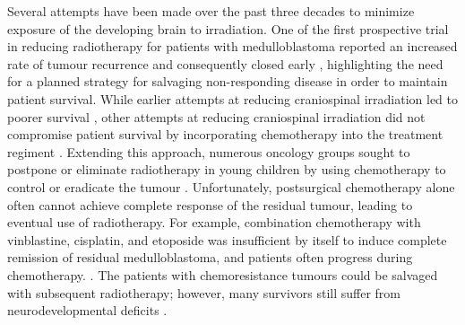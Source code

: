 Several attempts have been made over the past three decades to minimize exposure of the developing brain to irradiation. One of the first prospective trial in reducing radiotherapy for patients with medulloblastoma reported an increased rate of tumour recurrence and consequently closed early , highlighting the need for a planned strategy for salvaging non-responding disease in order to maintain patient survival. While earlier attempts at reducing craniospinal irradiation led to poorer survival , other attempts at reducing craniospinal irradiation did not compromise patient survival by incorporating chemotherapy into the treatment regiment . Extending this approach, numerous oncology groups sought to postpone or eliminate radiotherapy in young children by using chemotherapy to control or eradicate the tumour . Unfortunately, postsurgical chemotherapy alone often cannot achieve complete response of the residual tumour, leading to eventual use of radiotherapy. For example, combination chemotherapy with vinblastine, cisplatin, and etoposide was insufficient by itself to induce complete remission of residual medulloblastoma, and patients often progress during chemotherapy. . The patients with chemoresistance tumours could be salvaged with subsequent radiotherapy; however, many survivors still suffer from neurodevelopmental deficits .

